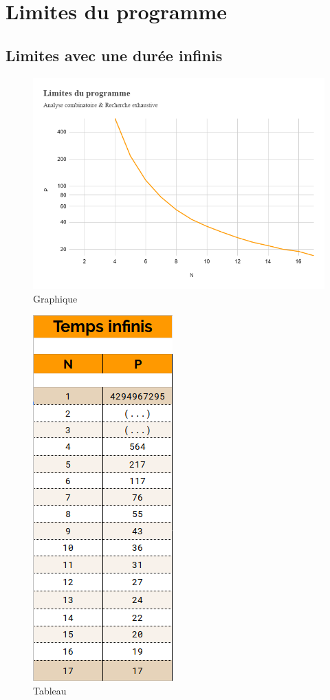 \documentclass[a4paper, 11pt, oneside]{article}
\begin{document}
\newpage
\section{Limites du programme}
\subsection{Limites avec une durée infinis
}

\begin{figure}[!h]
			\centering
\includegraphics[scale=0.4]{graphique1.png}
			\caption{Graphique}
		\end{figure}
		
\begin{figure}
\includegraphics[scale=0.5]{stats1.png}
\caption{Tableau}
\label{Tableau}
\end{figure}
\end{document}
